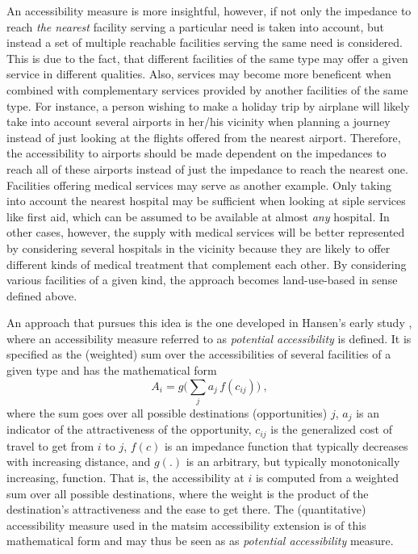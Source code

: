 An accessibility measure is more insightful, however, if not only the impedance to reach \textit{the nearest} facility serving a particular need is taken into account, but instead a set of multiple reachable facilities serving the same need is considered. This is due to the fact, that different facilities of the same type may offer a given service in different qualities. Also, services may become more beneficent when combined with complementary services provided by another facilities of the same type. For instance, a person wishing to make a holiday trip by airplane will likely take into account several airports in her/his vicinity when planning a journey instead of just looking at the flights offered from the nearest airport. Therefore, the accessibility to airports should be made dependent on the impedances to reach all of these airports instead of just the impedance to reach the nearest one. Facilities offering medical services may serve as another example. Only taking into account the nearest hospital may be sufficient when looking at siple services like first aid, which can be assumed to be available at almost \textit{any} hospital. In other cases, however, the supply with medical services will be better represented by considering several hospitals in the vicinity because they are likely to offer different kinds of medical treatment that complement each other. By considering various facilities of a given kind, the approach becomes land-use-based in sense defined above.

An approach that pursues this idea is the one developed in Hansen's early study \citep{Hansen1959}, where an accessibility measure referred to as \textit{potential accessibility} is defined. It is specified as the (weighted) sum over the accessibilities of several facilities of a given type and has the mathematical form
\begin{equation}
A_i = g\Big( \sum_j a_j \, f(c_{ij}) \Big) \ ,
\label{eq:accessibility:basic}
\end{equation}
where the sum goes over all possible destinations (opportunities) $j$, $a_j$ is an indicator of the attractiveness of the opportunity, $c_{ij}$ is the generalized cost of travel to get from $i$ to $j$, $f(c)$ is an impedance function that typically decreases with increasing distance, and $g(.)$ is an arbitrary, but typically monotonically increasing, function. That is, the accessibility at $i$ is computed from a weighted sum over all possible destinations, where the weight is the product of the destination's attractiveness and the ease to get there. The (quantitative) accessibility measure used in the \gls{matsim} accessibility extension is of this mathematical form and may thus be seen as as \textit{potential accessibility} measure.


